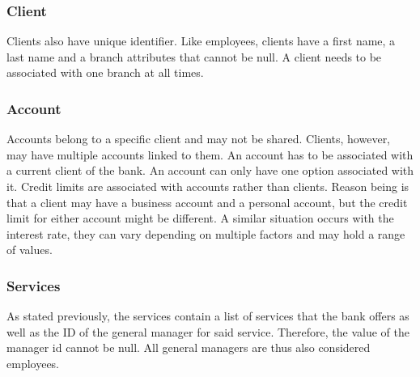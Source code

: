 \documentclass[letterpaper, 12pt]{article}
\begin{document}
\subsubsection{Client}
Clients also have unique identifier.
Like employees, clients have a first name, a last name and a branch attributes that cannot be null.
A client needs to be associated with one branch at all times.

\subsubsection{Account}
Accounts belong to a specific client and may not be shared.
Clients, however, may have multiple accounts linked to them.
An account has to be associated with a current client of the bank.
An account can only have one option associated with it. %
Credit limits are associated with accounts rather than clients.
Reason being is that a client may have a business account and a personal account, but the credit limit for either account might be different.
A similar situation occurs with the interest rate, they can vary depending on multiple factors and may hold a range of values.


\subsubsection{Services}
As stated previously, the services contain a list of services that the bank offers as well as the ID of the general manager for said service.
Therefore, the value of the manager id cannot be null. All general managers are thus also considered employees.

\end{document}
